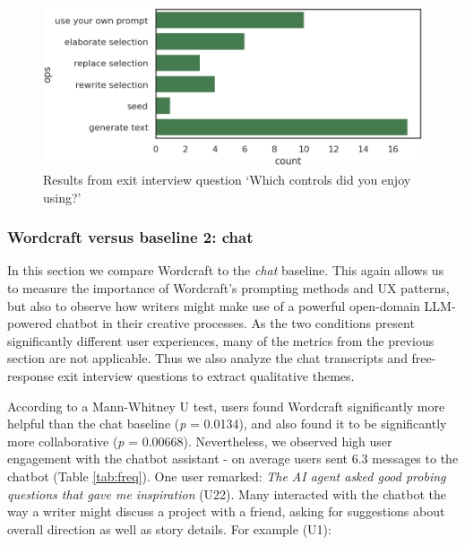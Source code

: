 \begin{figure}[htb]
  \centering
  \includegraphics[width=0.5\linewidth]{figures/favorite_ops.png}
  \caption{Results from exit interview question `Which controls did you enjoy using?'}
  \label{fig:favorite_ops}
\end{figure}


\subsubsection{Wordcraft versus baseline 2: chat}
In this section we compare Wordcraft to the \textit{chat} baseline. 
This again allows us to measure the importance of Wordcraft's prompting methods and UX patterns, but also to observe how writers might make use of a powerful open-domain LLM-powered chatbot in their creative processes.
As the two conditions present significantly different user experiences, many of the metrics from the previous section are not applicable.
Thus we also analyze the chat transcripts and free-response exit interview questions to extract qualitative themes.

According to a Mann-Whitney U test, users found Wordcraft significantly more helpful than the chat baseline (\textit{p} = 0.0134), and also found it to be significantly more collaborative (\textit{p} = 0.00668).  
Nevertheless, we observed high user engagement with the chatbot assistant - on average users sent 6.3  messages to the chatbot (Table \ref{tab:freq}). One user remarked: \textit{The AI agent asked good probing questions that gave me inspiration} (U22). Many interacted with the chatbot the way a writer might discuss a project with a friend, asking for suggestions about overall direction as well as story details. For example (U1):





